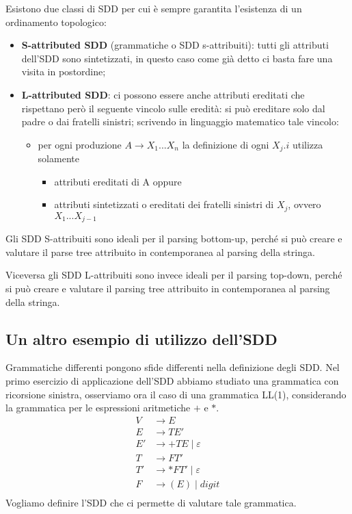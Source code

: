 \documentclass[class=book, crop=false, oneside, 12pt]{standalone}
\begin{document}
Esistono due classi di SDD per cui è sempre garantita l'esistenza di un ordinamento topologico:
\begin{itemize}
    \item \textbf{S-attributed SDD} (grammatiche o SDD s-attribuiti): tutti gli attributi dell'SDD sono sintetizzati, in questo caso come già detto ci basta fare una visita in postordine;
    \item \textbf{L-attributed SDD}: ci possono essere anche attributi ereditati che rispettano però il seguente vincolo sulle eredità: si può ereditare solo dal padre o dai fratelli sinistri; scrivendo in linguaggio matematico tale vincolo:
    \begin{itemize}
        \item per ogni produzione \(A \to X_1 ... X_n\) la definizione di ogni \(X_j.i\) utilizza solamente
        \begin{itemize}
            \item attributi ereditati di A oppure
            \item attributi sintetizzati o ereditati dei fratelli sinistri di \(X_j\), ovvero \(X_1 ... X_{j-1}\)
        \end{itemize}
    \end{itemize}
\end{itemize}
Gli SDD S-attribuiti sono ideali per il parsing bottom-up, perché si può creare e valutare il parse tree attribuito in contemporanea al parsing della stringa.

\noindent Viceversa gli SDD L-attribuiti sono invece ideali per il parsing top-down, perché si può creare e valutare il parsing tree attribuito in contemporanea al parsing della stringa.

\subsection{Un altro esempio di utilizzo dell'SDD}
Grammatiche differenti pongono sfide differenti nella definizione degli SDD.
Nel primo esercizio di applicazione dell'SDD abbiamo studiato una grammatica con ricorsione sinistra, osserviamo ora il caso di una grammatica LL(1), considerando la grammatica per le espressioni aritmetiche \(+\) e \(*\).
\begin{align*}
    V &\to E \\
    E &\to TE' \\
    E' &\to +TE \mid \varepsilon \\
    T &\to FT' \\
    T' &\to *FT' \mid \varepsilon \\
    F &\to (E) \mid digit \\
\end{align*}
Vogliamo definire l'SDD che ci permette di valutare tale grammatica.
\end{document}
